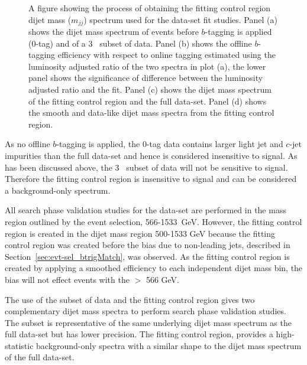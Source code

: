 \begin{figure}[!htb]
\caption{\label{fig:fittingCR}
  A figure showing the process of obtaining the \lm{} fitting control region dijet mass ($m_{jj}$) spectrum
  used for the \lm{} data-set fit studies.
  Panel (a) shows the dijet mass spectrum of events before $b$-tagging is applied (0-tag) and of a 3~\ifb{} subset of \lm{} data.
  Panel (b) shows the offline $b$-tagging efficiency with respect to online tagging estimated using the luminosity adjusted ratio of the two spectra in plot (a),
  the lower panel shows the significance of difference between the luminosity adjusted ratio and the fit.
  Panel (c) shows the dijet mass spectrum of the fitting control region and the full \lm{} data-set.
  Panel (d) shows the smooth and data-like dijet mass spectra from the fitting control region.
}
\end{figure}

As no offline $b$-tagging is applied,
the 0-tag data contains larger light jet and $c$-jet impurities than the full \lm{} data-set
and hence is considered insensitive to signal.
As has been discussed above, the  3~\ifb{} subset of data will not be sensitive to signal.
Therefore the fitting control region is insensitive to signal and can be considered a background-only spectrum.

All search phase validation studies for the \lm{} data-set are performed in the mass region outlined by the \lm{} event selection, 566-1533~GeV.
However, the fitting control region is created in the dijet mass region 500-1533 GeV
because the fitting control region was created before the bias due to non-leading jets, described in Section~\ref{sec:evt-sel_btrigMatch}, was observed.
As the fitting control region is created by applying a smoothed efficiency to each independent dijet mass bin,
the bias will not effect events with the \mjj{} $>$ 566 GeV.

The use of the subset of data and the fitting control region gives two complementary dijet mass spectra to perform search phase validation studies.
The subset is representative of the same underlying dijet mass spectrum as the full \lm{} data-set but has lower precision.
The fitting control region, provides a high-statistic background-only spectra with a similar shape to the dijet mass spectrum of the full \lm{} data-set.



